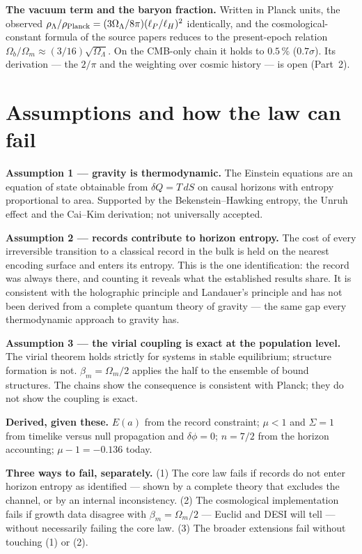 \textbf{The vacuum term and the baryon fraction.} Written in Planck units, the observed $\rho_\Lambda/\rho_{\rm Planck}=(3\Omega_\Lambda/8\pi)(\ell_P/\ell_H)^2$
identically, and the cosmological-constant formula of the source papers reduces to the present-epoch relation $\Omega_b/\Omega_m\approx(3/16)\sqrt{\Omega_\Lambda}$.
On the CMB-only chain it holds to $0.5\,\%$ ($0.7\sigma$). Its derivation --- the $2/\pi$ and the weighting over cosmic history --- is open (Part~2).

\section{Assumptions and how the law can fail}\label{sec:assumptions}
\textbf{Assumption 1 --- gravity is thermodynamic.} The Einstein equations are an equation of state obtainable from $\delta Q=T\,dS$ on causal horizons
with entropy proportional to area. Supported by the Bekenstein--Hawking entropy, the Unruh effect and the Cai--Kim derivation; not universally accepted.

\textbf{Assumption 2 --- records contribute to horizon entropy.} The cost of every irreversible transition to a classical record in the bulk is held on the
nearest encoding surface and enters its entropy. This is the one identification: the record was always there, and counting it reveals what the established results share. It is consistent with the holographic principle and
Landauer's principle and has not been derived from a complete quantum theory of gravity --- the same gap every thermodynamic approach to gravity has.

\textbf{Assumption 3 --- the virial coupling is exact at the population level.} The virial theorem holds strictly for systems in stable equilibrium;
structure formation is not. $\beta_m=\Omega_m/2$ applies the half to the ensemble of bound structures. The chains show the consequence is consistent with
Planck; they do not show the coupling is exact.

\textbf{Derived, given these.} $E(a)$ from the record constraint; $\mu<1$ and $\Sigma=1$ from timelike versus null propagation and $\delta\phi=0$; $n=7/2$ from
the horizon accounting; $\mu-1=-0.136$ today.

\textbf{Three ways to fail, separately.} (1) The core law fails if records do not enter horizon entropy as identified --- shown by a complete theory that
excludes the channel, or by an internal inconsistency. (2) The cosmological implementation fails if growth data disagree with $\beta_m=\Omega_m/2$ ---
Euclid and DESI will tell --- without necessarily failing the core law. (3) The broader extensions fail without touching (1) or (2).

